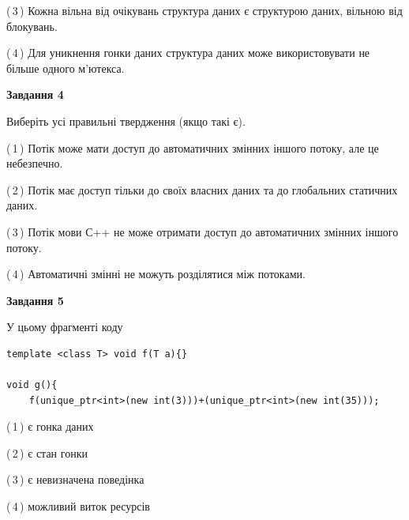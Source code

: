 \documentclass[12pt, ukrainian]{article}
\begin{document}
\begin {large}
{(\,3\,) Кожна вільна від очікувань структура даних є структурою даних, вільною від блокувань.%

(\,4\,) Для уникнення гонки даних структура даних може використовувати не більше одного м’ютекса.%



\begin{center}
\textbf{Завдання 4}
\end{center}
Виберіть усі правильні твердження (якщо такі є).\par
\vspace{2mm}

(\,1\,) Потік може мати доступ до автоматичних змінних іншого потоку, але це небезпечно.%

(\,2\,) Потік має доступ тільки до своїх власних даних та до глобальних статичних даних.%

(\,3\,) Потік мови С++ не може отримати доступ до автоматичних змінних іншого потоку.%

(\,4\,) Автоматичні змінні не можуть розділятися між потоками.%



\begin{center}
\textbf{Завдання 5}
\end{center}
У цьому фрагменті коду
\begin{verbatim}
template <class T> void f(T a){}

void g(){
    f(unique_ptr<int>(new int(3)))+(unique_ptr<int>(new int(35)));
\end{verbatim}

(\,1\,) є гонка даних%

(\,2\,) є стан гонки%

(\,3\,) є невизначена поведінка%

(\,4\,) можливий виток ресурсів%


}
\end {large}
\end{document}
